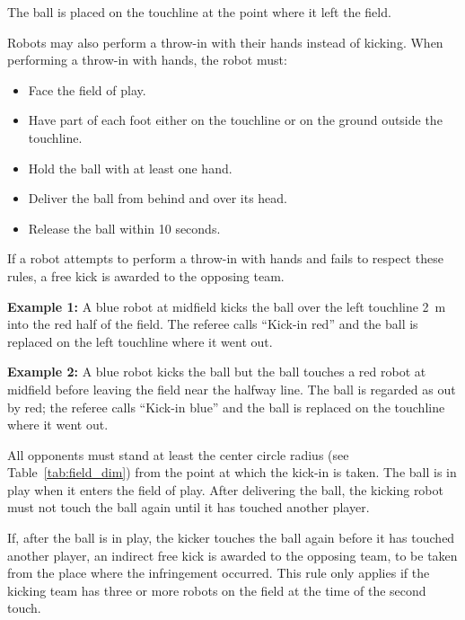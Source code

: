 
The ball is placed on the touchline at the point where it left the field.


Robots may also perform a throw-in with their hands instead of kicking. When performing a throw-in with hands, the robot must:
\begin{itemize}
  \item Face the field of play.
  \item Have part of each foot either on the touchline or on the ground outside the touchline.
  \item Hold the ball with at least one hand.
  \item Deliver the ball from behind and over its head.
  \item Release the ball within 10 seconds.
\end{itemize}

If a robot attempts to perform a throw-in with hands and fails to respect these rules, a free kick is awarded to the opposing team.


\textbf{Example 1:} A blue robot at midfield kicks the ball over the left touchline \qty{2}{\metre} into the red half of the field.
The referee calls ``Kick-in red'' and the ball is replaced on the left touchline where it went out.

\textbf{Example 2:} A blue robot kicks the ball but the ball touches a red robot at midfield before leaving the field near the halfway line.
The ball is regarded as out by red; the referee calls ``Kick-in blue'' and the ball is replaced on the touchline where it went out.


All opponents must stand at least the center circle radius (see Table~\ref{tab:field_dim}) from the point at which the kick-in is taken.
The ball is in play when it enters the field of play.
After delivering the ball, the kicking robot must not touch the ball again until it has touched another player.


If, after the ball is in play, the kicker touches the ball again before it has touched another player, an indirect free kick is awarded to the opposing team, to be taken from the place where the infringement occurred. This rule only applies if the kicking team has three or more robots on the field at the time of the second touch.

